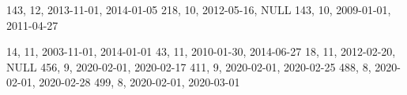 143, 12, 2013-11-01, 2014-01-05
218, 10, 2012-05-16, NULL
143, 10, 2009-01-01, 2011-04-27

14, 11, 2003-11-01, 2014-01-01
43, 11, 2010-01-30, 2014-06-27
18, 11, 2012-02-20, NULL
456, 9, 2020-02-01, 2020-02-17
411, 9, 2020-02-01, 2020-02-25
488, 8, 2020-02-01, 2020-02-28
499, 8, 2020-02-01, 2020-03-01

